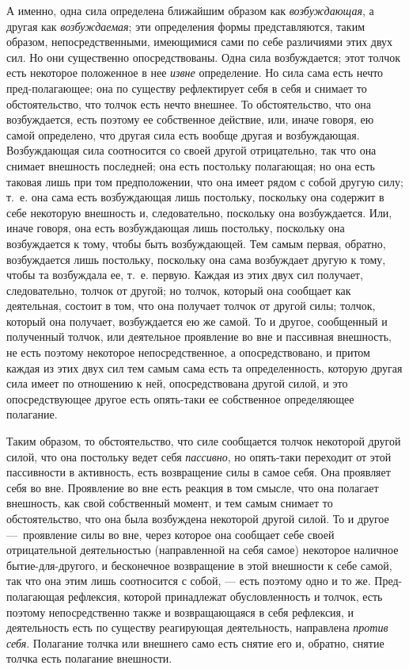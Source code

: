 А именно, одна сила определена ближайшим образом как
{\em возбуждающая}, а другая как
{\em возбуждаемая}; эти определения формы
представляются, таким образом, непосредственными, имеющимися сами по себе
различиями этих двух сил. Но они существенно опосредствованы. Одна сила
возбуждается; этот толчок есть некоторое положенное в нее
{\em извне} определение. Но сила сама есть нечто
пред-полагающее; она по существу рефлектирует себя в себя и снимает то
обстоятельство, что толчок есть нечто внешнее. То обстоятельство, что она
возбуждается, есть поэтому ее собственное действие, или, иначе говоря, ею
самой определено, что другая сила есть вообще другая и возбуждающая.
Возбуждающая сила соотносится со своей другой отрицательно, так что она
снимает внешность последней; она есть постольку полагающая; но она есть
таковая лишь при том предположении, что она имеет рядом с собой другую
силу; т.~е. она сама есть возбуждающая лишь постольку, поскольку она
содержит в себе некоторую внешность и, следовательно, поскольку она
возбуждается. Или, иначе говоря, она есть возбуждающая лишь постольку,
поскольку она возбуждается к тому, чтобы быть возбуждающей. Тем самым
первая, обратно, возбуждается лишь постольку, поскольку она сама возбуждает
другую к тому, чтобы та возбуждала ее, т.~е. первую. Каждая из этих двух
сил получает, следовательно, толчок от другой; но толчок, который она
сообщает как деятельная, состоит в том, что она получает толчок от другой
силы; толчок, который она получает, возбуждается ею же самой. То и другое,
сообщенный и полученный толчок, или деятельное проявление во вне и
пассивная внешность, не есть поэтому некоторое непосредственное, а
опосредствовано, и притом каждая из этих двух сил тем самым сама есть та
определенность, которую другая сила имеет по отношению к ней,
опосредствована другой силой, и это опосредствующее другое есть опять-таки
ее собственное определяющее полагание.

Таким образом, то обстоятельство, что силе сообщается толчок некоторой
другой силой, что она постольку ведет себя
{\em пассивно}, но опять-таки переходит от этой
пассивности в активность, есть возвращение силы в самое себя. Она проявляет
себя во вне. Проявление во вне есть реакция в том смысле, что она полагает
внешность, как свой собственный момент, и тем самым снимает то
обстоятельство, что она была возбуждена некоторой другой силой. То и другое
—~проявление силы во вне, через которое она сообщает себе своей
отрицательной деятельностью (направленной на себя самое) некоторое наличное
бытие-для-другого, и бесконечное возвращение в этой внешности к себе самой,
так что она этим лишь соотносится с собой, — есть поэтому одно и то же.
Пред-полагающая рефлексия, которой принадлежат обусловленность и толчок,
есть поэтому непосредственно также и возвращающаяся в себя рефлексия, и
деятельность есть по существу реагирующая деятельность, направлена
{\em против себя}. Полагание толчка или внешнего само
есть снятие его и, обратно, снятие толчка есть полагание внешности.


